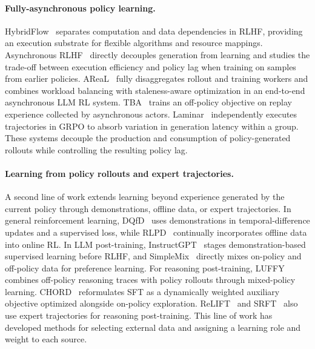 \documentclass[letterpaper]{article}
\begin{document}
\paragraph{Fully-asynchronous policy learning.}
HybridFlow~\citep{sheng2025hybridflow} separates computation and data dependencies in RLHF, providing an execution substrate for flexible algorithms and resource mappings.
Asynchronous RLHF~\citep{noukhovitch2025asyncrlhf} directly decouples generation from learning and studies the trade-off between execution efficiency and policy lag when training on samples from earlier policies.
AReaL~\citep{fu2025areal} fully disaggregates rollout and training workers and combines workload balancing with staleness-aware optimization in an end-to-end asynchronous LLM RL system.
TBA~\citep{bartoldson2025tba} trains an off-policy objective on replay experience collected by asynchronous actors.
Laminar~\citep{sheng2026laminar} independently executes trajectories in GRPO to absorb variation in generation latency within a group.
These systems decouple the production and consumption of policy-generated rollouts while controlling the resulting policy lag.

\paragraph{Learning from policy rollouts and expert trajectories.}
A second line of work extends learning beyond experience generated by the current policy through demonstrations, offline data, or expert trajectories.
In general reinforcement learning, DQfD~\citep{hester2018dqfd} uses demonstrations in temporal-difference updates and a supervised loss, while RLPD~\citep{ball2023rlpd} continually incorporates offline data into online RL.
In LLM post-training, InstructGPT~\citep{ouyang2022instructgpt} stages demonstration-based supervised learning before RLHF, and SimpleMix~\citep{li2025simplemix} directly mixes on-policy and off-policy data for preference learning.
For reasoning post-training, LUFFY~\citep{yan2025luffy} combines off-policy reasoning traces with policy rollouts through mixed-policy learning.
CHORD~\citep{zhang2026chord} reformulates SFT as a dynamically weighted auxiliary objective optimized alongside on-policy exploration.
ReLIFT~\citep{ma2026relift} and SRFT~\citep{fu2026srft} also use expert trajectories for reasoning post-training.
This line of work has developed methods for selecting external data and assigning a learning role and weight to each source.
\end{document}
